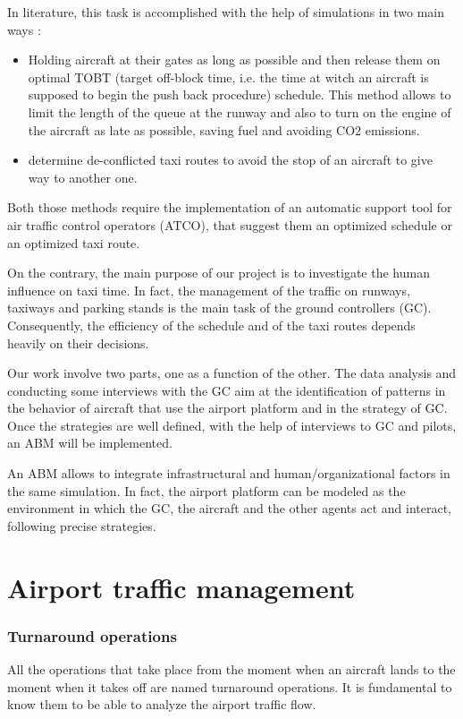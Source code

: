 \documentclass{article}
\begin{document}
In literature, this task is accomplished with the help of simulations in two main ways \cite{rathinam}:

\begin{itemize}
	\item Holding aircraft at their gates as
	long as possible and then release them on optimal TOBT (target off-block time, i.e. the time at witch an aircraft is supposed to begin the push back procedure)
	schedule. This method allows to limit the length of the queue at the runway and also to turn on the engine of the aircraft as late as possible, saving fuel and avoiding CO2 emissions.

	\item determine de-conflicted taxi routes to avoid the stop of an aircraft to give way to another one.
\end{itemize}

Both those methods require the implementation of an automatic support tool for air traffic control operators (ATCO), that suggest them an optimized schedule or an optimized taxi route.


On the contrary, the main purpose of our project is to investigate the human influence on taxi time.
In fact, the management of the traffic on runways, taxiways and parking stands is the main task of the ground controllers (GC). Consequently, the efficiency of the schedule and of the taxi routes depends heavily on their decisions.

Our work involve two parts, one as a function of the other. The data analysis and conducting some interviews with the GC aim at the identification of patterns in the behavior of aircraft that use the airport platform and in the strategy of GC. Once the strategies are well defined, with the help of interviews to GC and pilots, an ABM will be implemented. 

An ABM allows to integrate infrastructural and human/organizational factors in the same simulation. In fact, the airport platform can be modeled as the environment in which the GC, the aircraft and the other agents act and interact, following precise strategies.

\part{Airport traffic management}

\section{Turnaround operations}
All the operations that take place from the moment when an aircraft lands to the moment when it takes off are named turnaround operations. It is fundamental to know them to be able to analyze the airport traffic flow. 
\end{document}
